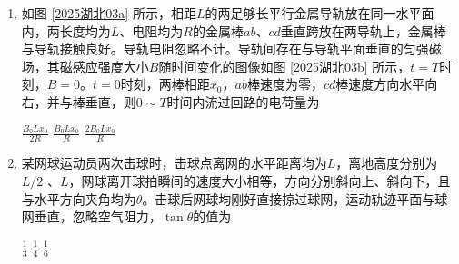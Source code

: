 \documentclass[\gkver]{gaokaozhenti}
\begin{document}
\begin{enumerate}
{	故选 A。
}

\item 
如图 \ref{2025湖北03a} 所示，相距$ L $的两足够长平行金属导轨放在同一水平面内，两长度均为$ L $、电阻均为$ R $的金属棒$ ab $、$ cd $垂直跨放在两导轨上，金属棒与导轨接触良好。导轨电阻忽略不计。导轨间存在与导轨平面垂直的匀强磁场，其磁感应强度大小$ B $随时间变化的图像如图 \ref{2025湖北03b} 所示，$ t=T $时刻，$ B=0 $。$ t=0 $时刻，两棒相距$ x_{0} $，$ ab $棒速度为零，$ cd $棒速度方向水平向右，并与棒垂直，则$ 0 \sim T $时间内流过回路的电荷量为  



{$\frac{B_0Lx_0}{2R}$}
{$\frac{B_0Lx_0}R$}
{$\frac{2B_0Lx_0}R$}


\item 
某网球运动员两次击球时，击球点离网的水平距离均为$ L $，离地高度分别为$L/2$ 、$ L $，网球离开球拍瞬间的速度大小相等，方向分别斜向上、斜向下，且与水平方向夹角均为$ \theta $。击球后网球均刚好直接掠过球网，运动轨迹平面与球网垂直，忽略空气阻力，$ \tan \theta $的值为  


{$\frac{1}{3}$}
{$\frac{1}{4}$}
{$\frac{1}{6}$}



\end{enumerate}
\end{document}
